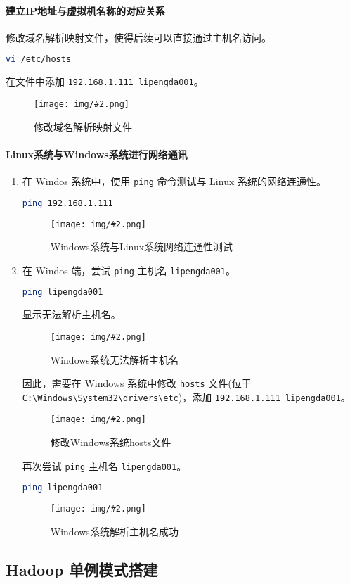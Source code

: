 \documentclass{article}
\newenvironment{enum}{
    \begin{enumerate}[label=(\arabic*), noitemsep]
}{
    \end{enumerate}
}
\newcommand{\img}[3][0.9]{%
    \begin{figure}[H]
        \centering
        \texttt{[image: img/\#2.png]}
        \caption{#3}
    \end{figure}
}
\newcommand{\subsubsubsection}[1]{\paragraph{#1}\mbox{}}
\begin{document}
\subsubsubsection{建立IP地址与虚拟机名称的对应关系}

修改域名解析映射文件，使得后续可以直接通过主机名访问。

\begin{lstlisting}[language=bash]
    vi /etc/hosts
\end{lstlisting}

在文件中添加 \texttt{192.168.1.111 lipengda001}。

\img{1.2.3.1}{修改域名解析映射文件}

\subsubsubsection{Linux系统与Windows系统进行网络通讯}

\begin{enum}
    \item 在 Windos 系统中，使用 \texttt{ping} 命令测试与 Linux 系统的网络连通性。
    
    \begin{lstlisting}[language=bash]
    ping 192.168.1.111
    \end{lstlisting}

    \img{1.2.4.1}{Windows系统与Linux系统网络连通性测试}

    \item 在 Windos 端，尝试 \texttt{ping} 主机名 \texttt{lipengda001}。
    
    \begin{lstlisting}[language=bash]
    ping lipengda001
    \end{lstlisting}

    显示无法解析主机名。

    \img{1.2.4.2}{Windows系统无法解析主机名}

    因此，需要在 Windows 系统中修改 \texttt{hosts} 文件(位于
    \texttt{C:\textbackslash Windows\textbackslash System32\textbackslash drivers\textbackslash etc})，添加 \texttt{192.168.1.111 lipengda001}。

    \img{1.2.4.3}{修改Windows系统hosts文件}

    再次尝试 \texttt{ping} 主机名 \texttt{lipengda001}。

    \begin{lstlisting}[language=bash]
    ping lipengda001
    \end{lstlisting}

    \img{0.1.2.4.4}{Windows系统解析主机名成功}
\end{enum}

\subsection{Hadoop 单例模式搭建}
\end{document}
